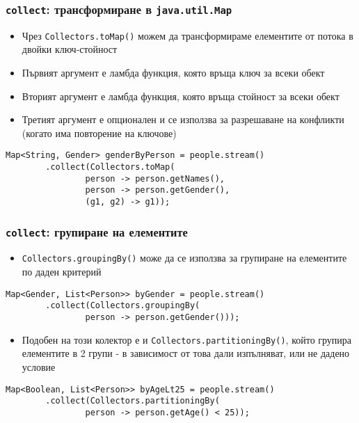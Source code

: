 \documentclass[ignorenonframetext, hyperref=unicode,compress,pdflatex]{beamer}
\begin{document}
\begin{frame}[containsverbatim]\frametitle{\lstinline{collect}: трансформиране
в \lstinline{java.util.Map}}
\begin{itemize}
  \item Чрез \lstinline{Collectors.toMap()} можем да трансформираме елементите
  от потока в двойки ключ-стойност
  \item Първият аргумент е ламбда функция, която връща ключ за всеки обект
  \item Вторият аргумент е ламбда функция, която връща стойност за всеки обект
  \item Третият аргумент е опционален и се използва за разрешаване на конфликти
  (когато има повторение на ключове)
\end{itemize}
\begin{lstlisting}
Map<String, Gender> genderByPerson = people.stream()
		.collect(Collectors.toMap(
				person -> person.getNames(),
				person -> person.getGender(),
				(g1, g2) -> g1));
\end{lstlisting}

\end{frame}

\begin{frame}[containsverbatim]\frametitle{\lstinline{collect}: групиране на
елементите}
\begin{itemize}
  \item \lstinline{Collectors.groupingBy()} може да се използва за групиране на
  елементите по даден критерий
\end{itemize}
\begin{lstlisting}
Map<Gender, List<Person>> byGender = people.stream()
		.collect(Collectors.groupingBy(
				person -> person.getGender()));
\end{lstlisting}
\begin{itemize}
  \item Подобен на този колектор е и \lstinline{Collectors.partitioningBy()},
  който групира елементите в 2 групи - в зависимост от това дали изпълняват, или
  не дадено условие
\end{itemize}
\begin{lstlisting}
Map<Boolean, List<Person>> byAgeLt25 = people.stream()
		.collect(Collectors.partitioningBy(
				person -> person.getAge() < 25));
\end{lstlisting}
\end{frame}
\end{document}
